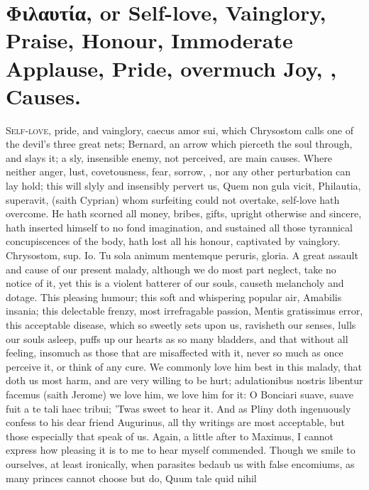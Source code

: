 {\section[\textgreek{Φιλαυτία}, or Self-love]{\textgreek{Φιλαυτία}, or Self-love, Vainglory, Praise, Honour, Immoderate Applause, Pride, overmuch Joy, \etc{}, Causes.}
\lettrine{S}{elf-love}, pride, and vainglory, caecus amor sui, which
Chrysostom calls one of the devil's three great nets; Bernard, an
arrow which pierceth the soul through, and slays it; a sly, insensible
enemy, not perceived, are main causes. Where neither anger, lust,
covetousness, fear, sorrow, \etc{}, nor any other perturbation can lay
hold; this will slyly and insensibly pervert us, Quem non gula vicit,
Philautia, superavit, (saith Cyprian) whom surfeiting could not
overtake, self-love hath overcome. He hath scorned all money,
bribes, gifts, upright otherwise and sincere, hath inserted himself to
no fond imagination, and sustained all those tyrannical concupiscences
of the body, hath lost all his honour, captivated by vainglory.
Chrysostom, sup. Io. Tu sola animum mentemque peruris, gloria. A great
assault and cause of our present malady, although we do most part
neglect, take no notice of it, yet this is a violent batterer of our
souls, causeth melancholy and dotage. This pleasing humour; this soft
and whispering popular air, Amabilis insania; this delectable frenzy,
most irrefragable passion, Mentis gratissimus error, this acceptable
disease, which so sweetly sets upon us, ravisheth our senses, lulls our
souls asleep, puffs up our hearts as so many bladders, and that without
all feeling, insomuch as those that are misaffected with it,
never so much as once perceive it, or think of any cure. We commonly
love him best in this malady, that doth us most harm, and are
very willing to be hurt; adulationibus nostris libentur facemus (saith
 Jerome) we love him, we love him for it: O Bonciari suave,
suave fuit a te tali haec tribui; 'Twas sweet to hear it. And as
Pliny doth ingenuously confess to his dear friend Augurinus, all
thy writings are most acceptable, but those especially that speak of
us. Again, a little after to Maximus, I cannot express how
pleasing it is to me to hear myself commended. Though we smile to
ourselves, at least ironically, when parasites bedaub us with false
encomiums, as many princes cannot choose but do, Quum tale quid nihil
}
